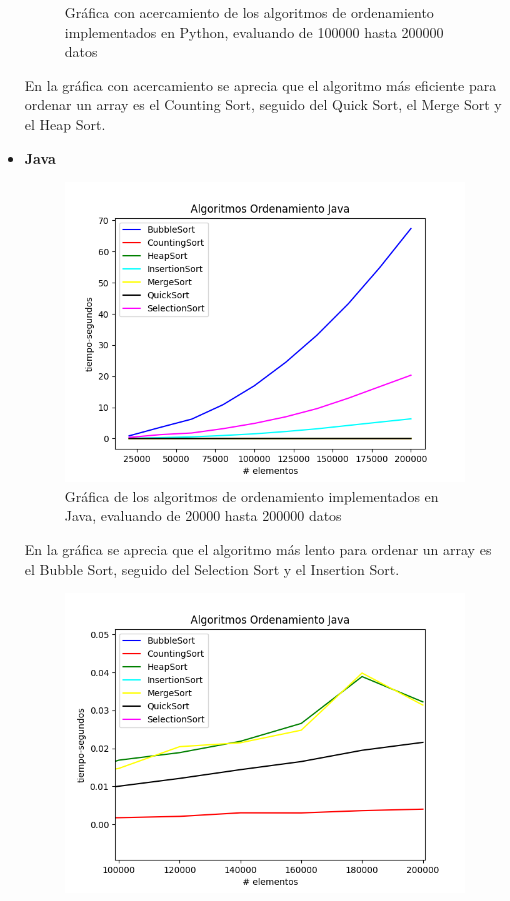 \begin{itemize}
\begin{figure}[H]
	        \caption{Gráfica con acercamiento de los algoritmos de ordenamiento implementados en Python, evaluando de 100000 hasta 200000 datos}
		\end{figure}
En la gráfica con acercamiento se aprecia que el algoritmo más eficiente para ordenar un array es el Counting Sort, seguido del Quick Sort, el Merge Sort y el Heap Sort.
    \item \textbf{Java}
        \begin{figure}[H]
	        \centering
	        \includegraphics[scale=0.5]{../images/plots/Sorts_Java.png}
	        \caption{Gráfica de los algoritmos de ordenamiento implementados en Java, evaluando de 20000 hasta 200000 datos}
		\end{figure}
En la gráfica se aprecia que el algoritmo más lento para ordenar un array es el Bubble Sort, seguido del Selection Sort y el Insertion Sort.
        \begin{figure}[H]
	        \centering
	        \includegraphics[scale=0.5]{Practica01/images/plots/Sorts2_Java.png}

\end{figure}
\end{itemize}
